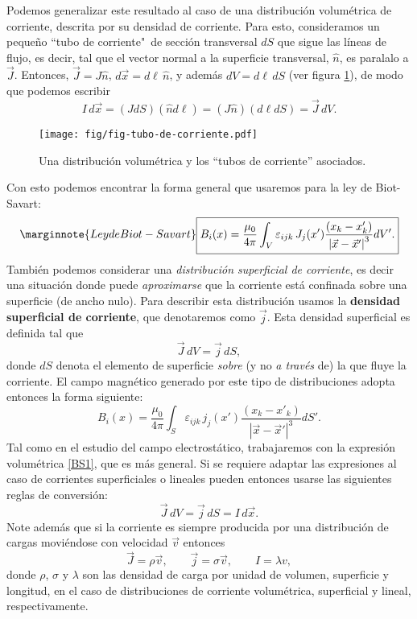 Podemos generalizar este resultado al caso de una distribución volumétrica de corriente, descrita por su densidad de corriente. Para esto, consideramos un pequeño ``tubo de corriente"\, de sección transversal $dS$ que sigue las líneas de flujo, es decir, tal que el vector normal a la superficie transversal, $\hat{n}$, es paralalo a $\vec{J}$. Entonces, $\vec{J}=J\hat{n}$, $d\vec{x}=d\ell\,\hat{n}$, y además $dV=d\ell\, dS$ (ver figura \ref{fig:tc}), de modo que podemos escribir
\begin{equation}
I\, d\vec{x}=(J dS)(\hat{n}d\ell)=(J\hat{n})(d\ell dS)=\vec{J}\,dV.
\end{equation}
\begin{figure}[!h]
\centerline{\texttt{[image: fig/fig-tubo-de-corriente.pdf]}}
\caption{Una distribución volumétrica y los ``tubos de corriente'' asociados.}
\label{fig:tc}
\end{figure}
Con esto podemos encontrar la forma general que usaremos para la ley de Biot-Savart:
\begin{equation}\marginnote{Ley de Biot-Savart}
 \boxed{B_i(x)=\frac{\mu_0}{4\pi}\int_V\varepsilon_{ijk}\,J_j(x')
\frac{\left(x_k-x'_k\right)}{\left\vert\vec{x}-\vec{x}'\right\vert^3}dV'. }
\label{BS2}
\end{equation}
También podemos considerar una \textit{distribución superficial de corriente}, es decir una situación donde puede \textit{aproximarse} que la corriente está confinada sobre una superficie (de ancho nulo). Para describir esta distribución usamos la \textbf{densidad superficial de corriente}, que denotaremos como $\vec{j}$. Esta densidad superficial es definida tal que
\begin{equation}
\vec{J}\,dV=\vec{j}\,dS,
\end{equation}
donde $dS$ denota el elemento de superficie \textit{sobre} (y no \textit{a través} de) la que fluye la corriente. El campo magnético generado por este tipo de distribuciones adopta entonces la forma siguiente:
\begin{equation}
 \boxed{B_i(x)=\frac{\mu_0}{4\pi}\int_S\varepsilon_{ijk}\,j_j(x')
\frac{\left(x_k-x'_k\right)}{\left\vert\vec{x}-\vec{x}'\right\vert^3}dS'. }
\label{BSsup}
\end{equation}
Tal como en el estudio del campo electrostático, trabajaremos con la expresión volumétrica \eqref{BS1}, que es más general. Si se requiere adaptar las expresiones al caso de corrientes superficiales o lineales pueden entonces usarse las siguientes reglas de conversión:
\begin{equation}\label{IdxJdV}
\vec{J}\,dV=\vec{j}\,dS=I\,d\vec{x}.
\end{equation}
Note además que si la corriente es siempre producida por una distribución de cargas moviéndose con velocidad $\vec{v}$ entonces 
\begin{equation}
\vec{J}=\rho\vec{v}, \qquad \vec{j}=\sigma\vec{v}, \qquad I=\lambda v,
\end{equation}
donde $\rho$, $\sigma$ y $\lambda$ son las densidad de carga por unidad de volumen, superficie y longitud, en el caso de distribuciones de corriente volumétrica, superficial y lineal, respectivamente.

